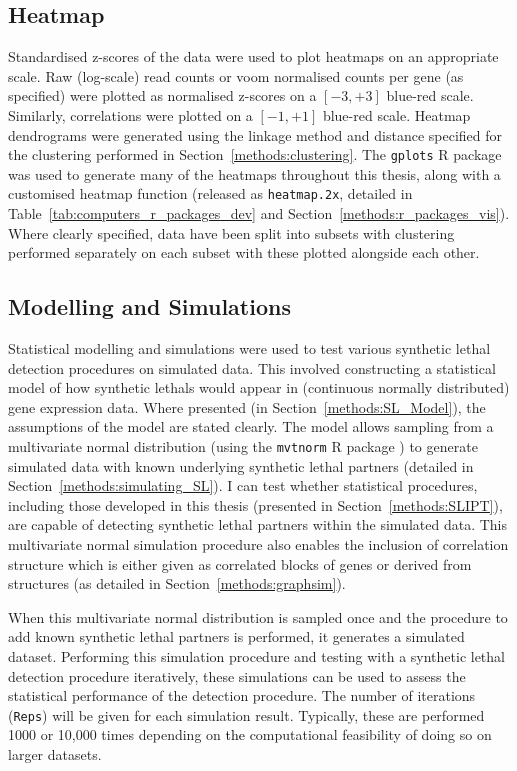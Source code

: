 \subsection{Heatmap} \label{methods:heatmap}
Standardised z-scores of the data were used to plot heatmaps on an appropriate scale. Raw (log-scale) read counts or voom normalised counts per gene (as specified) were plotted  as normalised z-scores on a $[-3,+3]$ blue-red scale. Similarly, correlations were plotted on a $[-1,+1]$ blue-red scale. Heatmap dendrograms were generated using the linkage method and distance specified for the clustering performed in Section~\ref{methods:clustering}. The \texttt{gplots} R package \citep{gplots} was used to generate many of the heatmaps throughout this thesis, along with a customised heatmap function (released as \texttt{heatmap.2x}, detailed in Table~\ref{tab:computers_r_packages_dev} and Section~\ref{methods:r_packages_vis}). Where clearly specified, data have been split into subsets with clustering performed separately on each subset with these plotted alongside each other.

\subsection{Modelling and Simulations} \label{methods:simulation}
Statistical modelling and simulations were used to test various \gls{synthetic lethal} detection procedures on simulated data. This involved constructing a statistical model of how \glspl{synthetic lethal} would appear in (continuous normally distributed) \gls{gene expression} data. Where presented (in Section~\ref{methods:SL_Model}), the assumptions of the model are stated clearly. The model allows sampling from a multivariate normal distribution (using the \texttt{mvtnorm} R package \citep{Genz2009, mvtnorm}) to generate simulated data with known underlying \gls{synthetic lethal} partners (detailed in Section~\ref{methods:simulating_SL}). I can test whether statistical procedures, including those developed in this thesis (presented in Section~\ref{methods:SLIPT}), are capable of detecting \gls{synthetic lethal} partners within the simulated data. This multivariate normal simulation procedure also enables the inclusion of correlation structure which is either given as correlated blocks of genes or derived from  structures (as detailed in Section~\ref{methods:graphsim}).

When this multivariate normal distribution is sampled once and the procedure to add known \gls{synthetic lethal} partners is performed, it generates a simulated dataset. Performing this simulation procedure and testing with a \gls{synthetic lethal} detection procedure iteratively, these simulations can be used to assess the statistical performance of the detection procedure. The number of iterations (\texttt{Reps}) will be given for each simulation result. Typically, these are performed 1000 or 10,000 times depending on \textcolor{black}{the} computational feasibility of doing so on larger datasets. 

